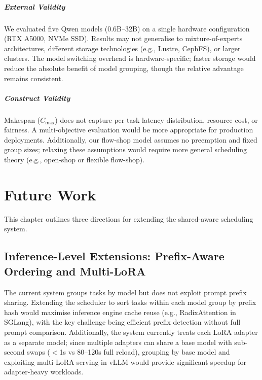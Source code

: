 \documentclass[logo,bsc,singlespacing,parskip,online]{infthesis}
\begin{document}
\paragraph{External Validity}
We evaluated five Qwen models (0.6B--32B) on a single hardware configuration (RTX A5000, NVMe SSD). Results may not generalise to mixture-of-experts architectures, different storage technologies (e.g., Lustre, CephFS), or larger clusters. The model switching overhead is hardware-specific; faster storage would reduce the absolute benefit of model grouping, though the relative advantage remains consistent.

\paragraph{Construct Validity}
Makespan ($C_{\max}$) does not capture per-task latency distribution, resource cost, or fairness. A multi-objective evaluation would be more appropriate for production deployments. Additionally, our flow-shop model assumes no preemption and fixed group sizes; relaxing these assumptions would require more general scheduling theory (e.g., open-shop or flexible flow-shop).





\chapter{Future Work}
\label{ch:future}

This chapter outlines three directions for extending the shared-aware scheduling system.

\section{Inference-Level Extensions: Prefix-Aware Ordering and Multi-LoRA}

The current system groups tasks by model but does not exploit prompt prefix sharing. Extending the scheduler to sort tasks within each model group by prefix hash would maximise inference engine cache reuse (e.g., RadixAttention in SGLang), with the key challenge being efficient prefix detection without full prompt comparison. Additionally, the system currently treats each LoRA adapter as a separate model; since multiple adapters can share a base model with sub-second swaps ($<$1s vs 80--120s full reload), grouping by base model and exploiting multi-LoRA serving in vLLM \citep{sheng2024slora} would provide significant speedup for adapter-heavy workloads.
\end{document}
